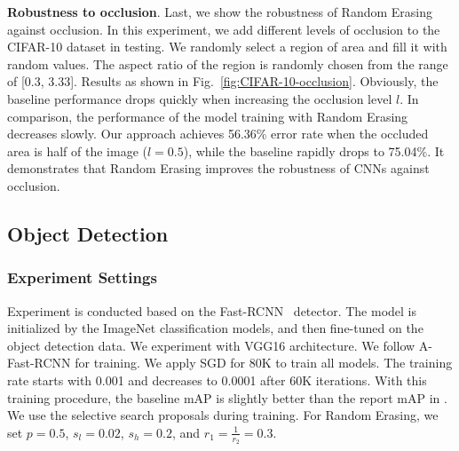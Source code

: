 \documentclass[10pt,twocolumn,letterpaper]{article}
\begin{document}
\textbf{Robustness to occlusion}.
Last, we show the robustness of Random Erasing against occlusion. In this experiment, we add different levels of occlusion to the CIFAR-10 dataset in testing. We randomly select a region of area and fill it with random values. The aspect ratio of the region is randomly chosen from the range of [0.3, 3.33]. Results as shown in Fig.~\ref{fig:CIFAR-10-occlusion}. Obviously, the baseline performance drops quickly when increasing the occlusion level $l$. In comparison, the performance of the model training with Random Erasing decreases slowly. Our approach achieves 56.36\% error rate when the occluded area is half of the image ($l = 0.5$), while the baseline rapidly drops to 75.04\%. It demonstrates that Random Erasing improves the robustness of CNNs against occlusion.



\subsection{Object Detection}
\subsubsection{Experiment Settings} Experiment is conducted based on the Fast-RCNN~\cite{fast-rcnn} detector. The model is initialized by the ImageNet classification models, and then fine-tuned on the object detection data. We experiment with VGG16 \cite{vgg} architecture. We follow A-Fast-RCNN \cite{A-fast-rcnn} for training. We apply SGD for 80K to train all models. The training rate starts with 0.001 and decreases to 0.0001 after 60K iterations. With this training procedure, the baseline mAP is slightly better than the report mAP in \cite{fast-rcnn}. We use the selective search proposals during training. For  Random Erasing, we set $p = 0.5$, $s_l = 0.02$, $s_h = 0.2$, and $r_1 = \frac{1}{r_2} = 0.3$. %


\end{document}
